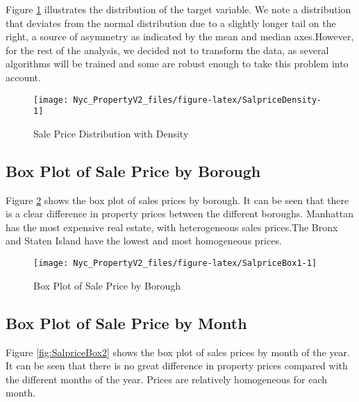 \documentclass[
]{article}
\begin{document}
Figure \ref{fig:SalpriceDensity} illustrates the distribution of the target variable. We note a distribution that deviates from the normal distribution due to a slightly longer tail on the right, a source of asymmetry as indicated by the mean and median axes.However, for the rest of the analysis, we decided not to transform the data, as several algorithms will be trained and some are robust enough to take this problem into account.

\begin{figure}[H]

{\centering \texttt{[image: Nyc\_PropertyV2\_files/figure-latex/SalpriceDensity-1]} 

}

\caption{Sale Price Distribution with Density}\label{fig:SalpriceDensity}
\end{figure}

\hypertarget{box-plot-of-sale-price-by-borough}{%
\subsection{Box Plot of Sale Price by Borough}\label{box-plot-of-sale-price-by-borough}}

Figure \ref{fig:SalpriceBox1} shows the box plot of sales prices by borough. It can be seen that there is a clear difference in property prices between the different boroughs. Manhattan has the most expensive real estate, with heterogeneous sales prices.The Bronx and Staten Island have the lowest and most homogeneous prices.

\begin{figure}[H]

{\centering \texttt{[image: Nyc\_PropertyV2\_files/figure-latex/SalpriceBox1-1]} 

}

\caption{Box Plot of Sale Price by Borough}\label{fig:SalpriceBox1}
\end{figure}

\hypertarget{box-plot-of-sale-price-by-month}{%
\subsection{Box Plot of Sale Price by Month}\label{box-plot-of-sale-price-by-month}}

Figure \ref{fig:SalpriceBox2} shows the box plot of sales prices by month of the year. It can be seen that there is no great difference in property prices compared with the different months of the year. Prices are relatively homogeneous for each month.
\end{document}
